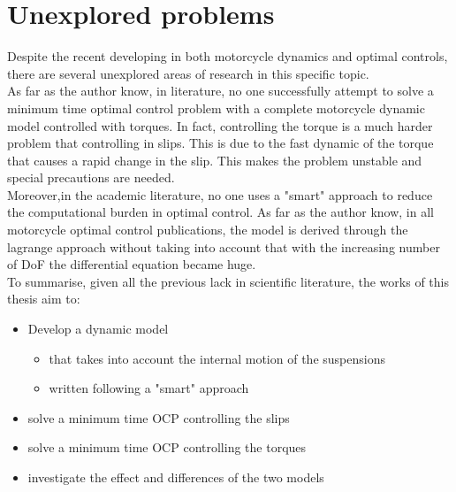 \section{Unexplored problems}
%
Despite the recent developing in both motorcycle dynamics and optimal controls, there are several unexplored areas of research in this specific topic.\\
As far as the author know, in literature, no one successfully attempt to solve a minimum time optimal control problem with a complete motorcycle dynamic model controlled with torques. In fact, controlling the torque is a much harder problem that controlling in slips. This is due to the fast dynamic of the torque that causes a rapid change in the slip. This makes the problem unstable and special precautions are needed.\\
Moreover,in the academic literature, no one uses a "smart" approach to reduce the computational burden in optimal control. As far as the author know, in all motorcycle optimal control publications, the model is derived through the lagrange approach without taking into account that with the increasing number of DoF the differential equation became huge.\\
To summarise, given all the previous lack in scientific literature, the works of this thesis aim to:
%
\begin{itemize}
    \setlength{\itemsep}{0pt}
    \item Develop a dynamic model 
    \begin{itemize}
        \setlength{\itemsep}{0pt}
        \item that takes into account the internal motion of the suspensions
        \item written following a "smart" approach
    \end{itemize}
    \item solve a minimum time OCP controlling the slips
    \item solve a minimum time OCP controlling the torques
    \item investigate the effect and differences of the two models
\end{itemize} 
%